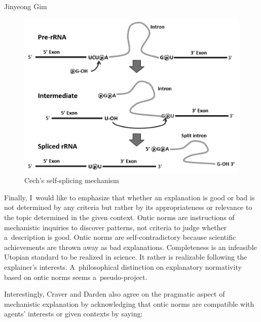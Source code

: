\begin{artengenv}{Jinyeong Gim}
\begin{figure}[H]
 \begin{center}
 \includegraphics[width=\textwidth]{ART_Gim/fig.7_splicing_bw.png}%
 \end{center}%
 \caption{Cech's self-splicing mechanism
 \parencite[based on][p.582]{zaug_autocatalytic_1983}}\label{gim.fig7}
\end{figure}


Finally, I~would like to emphasize that whether an explanation is good or bad is not determined by any criteria but rather by its appropriateness or relevance to the topic determined in the given context. Ontic norms are instructions of mechanistic inquiries to discover patterns, not criteria to judge whether a~description is good. Ontic norms are self-contradictory because scientific achievements are thrown away as bad explanations. Completeness is an infeasible Utopian standard to be realized in science. It rather is realizable following the explainer's interests. A~philosophical distinction on explanatory normativity based on ontic norms seems a~pseudo-project.

Interestingly, Craver and Darden also agree on the pragmatic aspect of mechanistic explanation by acknowledging that ontic norms are compatible with agents' interests or given contexts by saying:


\end{artengenv}
